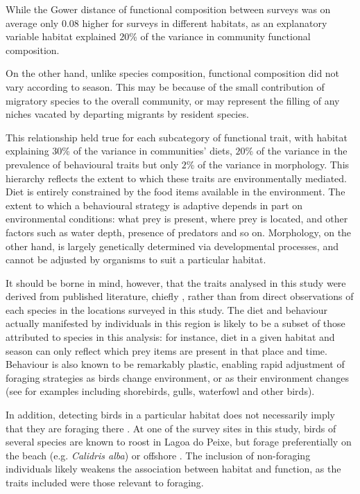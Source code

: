 \documentclass[12pt,a4paper]{book}
\begin{document}
While the Gower distance of functional composition between surveys was on average only $0.08$ higher for surveys in different habitats, as an explanatory variable habitat explained $20$\% of the variance in community functional composition.

On the other hand, unlike species composition, functional composition did not vary according to season. This may be because of the small contribution of migratory species to the overall community, or may represent the filling of any niches vacated by departing migrants by resident species.

This relationship held true for each subcategory of functional trait, with habitat explaining $30$\% of the variance in communities' diets, $20$\% of the variance in the prevalence of behavioural traits but only $2$\% of the variance in morphology. This hierarchy reflects the extent to which these traits are environmentally mediated. Diet is entirely constrained by the food items available in the environment. The extent to which a behavioural strategy is adaptive depends in part on environmental conditions: what prey is present, where prey is located, and other factors such as water depth, presence of predators and so on. Morphology, on the other hand, is largely genetically determined via developmental processes, and cannot be adjusted by organisms to suit a particular habitat.

It should be borne in mind, however, that the traits analysed in this study were derived from published literature, chiefly \citet{DelHoyo2016}, rather than from direct observations of each species in the locations surveyed in this study. The diet and behaviour actually manifested by individuals in this region is likely to be a subset of those attributed to species in this analysis: for instance, diet in a given habitat and season can only reflect which prey items are present in that place and time. Behaviour is also known to be remarkably plastic, enabling rapid adjustment of foraging strategies as birds change environment, or as their environment changes (see \citet{Piersma2011} for examples including shorebirds, gulls, waterfowl and other birds). 

In addition, detecting birds in a particular habitat does not necessarily imply that they are foraging there \citep{Jones2001a}. At one of the survey sites in this study, birds of several species are known to roost in Lagoa do Peixe, but forage preferentially on the beach (e.g. \textit{Calidris alba}) or offshore \citep[e.g. \textit{Sterna hirundo};][]{LaraResende1988}. The inclusion of non-foraging individuals likely weakens the association between habitat and function, as the traits included were those relevant to foraging. 
\end{document}
